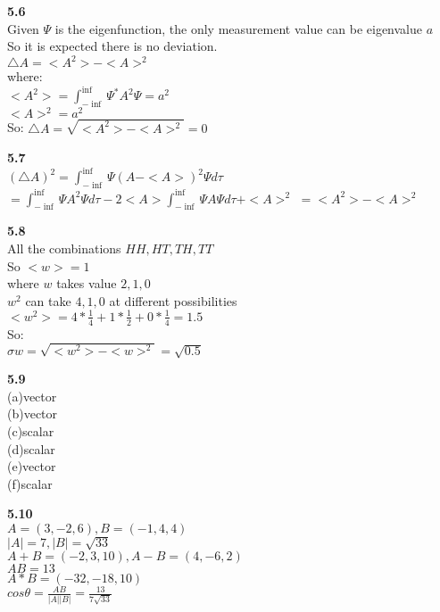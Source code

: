 \documentclass{article}
\begin{document}
\textbf{5.6}\\
Given $\Psi$ is the eigenfunction, the only measurement value can be eigenvalue $a$\\
So it is expected there is no deviation.\\
$\triangle A = <A^2> - <A>^2$\\
where:\\
$<A^2> = \int_{-\inf}^{\inf}\Psi^*A^2\Psi = a^2$\\
$<A>^2 = a^2$\\
So:
$\triangle A = \sqrt{<A^2> - <A>^2} = 0$\\
\newline

\textbf{5.7}\\
$(\triangle A)^2 = \int_{-\inf}^{\inf}\Psi(A - <A>)^2\Psi d\tau$\\
$=\int_{-\inf}^{\inf}\Psi A^2 \Psi d\tau - 2<A>\int_{-\inf}^{\inf}\Psi A \Psi d\tau + <A>^2$
$=<A^2> - <A>^2$\\
\newline

\textbf{5.8}\\
All the combinations $HH, HT, TH, TT$\\
So $<w> = 1$\\
where $w$ takes value $2,1,0$\\
$w^2$ can take $4,1,0$ at different possibilities\\
$<w^2> = 4*\frac{1}{4} + 1*\frac{1}{2} + 0*\frac{1}{4} = 1.5$\\
So:\\
$\sigma w = \sqrt{<w^2> - <w>^2} = \sqrt{0.5}$\\
\newline

\textbf{5.9}\\
(a)vector\\
(b)vector\\
(c)scalar\\
(d)scalar\\
(e)vector\\
(f)scalar\\
\newline

\textbf{5.10}\\
$A = (3,-2,6), B = (-1,4,4)$\\
$|A| = 7, |B| = \sqrt{33}$\\
$A+B = (-2,3,10), A-B = (4,-6,2)$\\
$AB = 13$\\
$A*B = (-32,-18,10)$\\
$cos\theta = \frac{AB}{|A||B|} = \frac{13}{7\sqrt{33}}$\\
\newline
\end{document}
